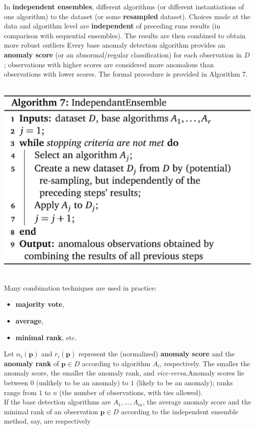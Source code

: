\documentclass[20pt,landscape,footrule,headrule]{foils}
\newcommand{\newl}{\newline\newline}
\def\fh{\foilhead}
\begin{document}
{{\fh{Independent Ensembles}
\noindent In \textbf{independent ensembles}, different algorithms (or different instantiations of one algorithm) to the dataset (or some \textbf{resampled} dataset). \newl Choices made at the data and algorithm level are \textbf{independent} of preceding runs results (in comparison with sequential ensembles). The results are then combined to obtain more robust outliers \newl Every base anomaly detection algorithm provides an \textbf{a\-no\-ma\-ly score} (or an abnormal/regular classification) for each observation in $D$; observations with higher scores are considered more anomalous than  observations with lower scores.  \newl The formal procedure is provided in Algorithm 7.  
\newpage\ \begin{center}
\includegraphics[height=0.9\textheight]{Images/Algorithm7}
\end{center}
\newpage\ \\ \noindent  Many combination techniques are used in practice:  \begin{itemize}
\item \textbf{majority vote}, 
\item \textbf{average}, 
\item \textbf{minimal rank}, etc. \end{itemize}  
Let $\alpha_i(\mathbf{p})$ and $r_i(\mathbf{p})$ represent the (normalized) \textbf{anomaly score} and the \textbf{anomaly rank} of $\mathbf{p}\in D$ according to algorithm $A_i$, respectively. The smaller the anomaly score, the smaller the anomaly rank, and \textit{vice-versa}.\newl Anomaly scores lie between $0$ (unlikely to be an anomaly) to $1$ (likely to be an anomaly); ranks range from $1$ to $n$ (the number of observations, with ties allowed). \newpage\ \\ \noindent  If the base detection algorithms are $A_1, \ldots, A_m$, the average anomaly score and the minimal rank of an observation $\mathbf{p}\in D$ according to the independent ensemble method, say, are  respectively
}}
\end{document}
